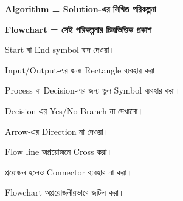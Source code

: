 \begin{center}

\textbf{Algorithm = Solution-এর লিখিত পরিকল্পনা}

\vspace{0.5mm}

\textbf{Flowchart = সেই পরিকল্পনার চিত্রভিত্তিক প্রকাশ}

\end{center}



\begin{compacttwocolpoints}

\item Start বা End symbol বাদ দেওয়া।

\item Input/Output-এর জন্য Rectangle ব্যবহার করা।

\item Process বা Decision-এর জন্য ভুল Symbol ব্যবহার করা।

\item Decision-এর Yes/No Branch না দেখানো।

\item Arrow-এর Direction না দেওয়া।

\item Flow line অপ্রয়োজনে Cross করা।

\item প্রয়োজন হলেও Connector ব্যবহার না করা।

\item Flowchart অপ্রয়োজনীয়ভাবে জটিল করা।

\end{compacttwocolpoints}


